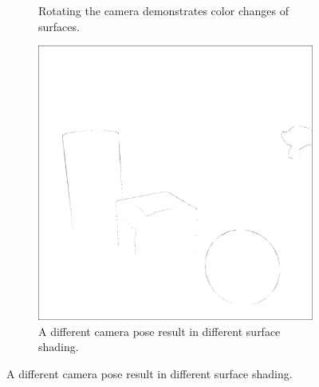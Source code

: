 \begin{figure}[H]
\begin{subfigure}[t]{0.32\textwidth}
        \caption{Rotating the camera demonstrates color changes of surfaces.}
    \end{subfigure}
    \begin{subfigure}[t]{0.32\textwidth}
        \includegraphics[width=\linewidth]{chapter04/img/flexion-0210.png}
        \caption{A different camera pose result in different surface shading.}
    \end{subfigure}
\end{figure}
